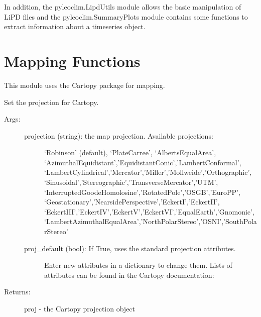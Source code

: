 \documentclass[letterpaper,10pt,english]{sphinxmanual}
\begin{document}
In addition, the pyleoclim.LipdUtils module allows the basic manipulation of LiPD files and the pyleoclim.SummaryPlots module
contains some functions to extract information about a timeseries object.


\chapter{Mapping Functions}
\label{\detokenize{Map:mapping-functions}}\label{\detokenize{Map::doc}}
This module uses the Cartopy package for mapping.

\begin{fulllineitems}
\label{\detokenize{Map:pyleoclim.Map.setProj}}
Set the projection for Cartopy.
\begin{description}
\item[{Args:}] \leavevmode\begin{description}
\item[{projection (string): the map projection. Available projections:}] \leavevmode
‘Robinson’ (default), ‘PlateCarree’, ‘AlbertsEqualArea’,
‘AzimuthalEquidistant’,’EquidistantConic’,’LambertConformal’,
‘LambertCylindrical’,’Mercator’,’Miller’,’Mollweide’,’Orthographic’,
‘Sinusoidal’,’Stereographic’,’TransverseMercator’,’UTM’,
‘InterruptedGoodeHomolosine’,’RotatedPole’,’OSGB’,’EuroPP’,
‘Geostationary’,’NearsidePerspective’,’EckertI’,’EckertII’,
‘EckertIII’,’EckertIV’,’EckertV’,’EckertVI’,’EqualEarth’,’Gnomonic’,
‘LambertAzimuthalEqualArea’,’NorthPolarStereo’,’OSNI’,’SouthPolarStereo’

\item[{proj\_default (bool): If True, uses the standard projection attributes.}] \leavevmode
Enter new attributes in a dictionary to change them. Lists of attributes
can be found in the Cartopy documentation:
\begin{quote}

\end{quote}

\end{description}

\item[{Returns:}] \leavevmode
proj - the Cartopy projection object

\end{description}

\end{fulllineitems}
\end{document}
